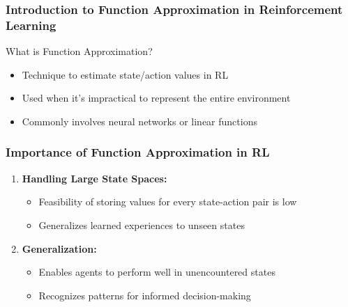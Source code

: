 \documentclass[aspectratio=169]{beamer}
\begin{document}
\frame{\titlepage}

\begin{frame}[fragile]
    \frametitle{Introduction to Function Approximation in Reinforcement Learning}
    \begin{block}{What is Function Approximation?}
        \begin{itemize}
            \item Technique to estimate state/action values in RL
            \item Used when it's impractical to represent the entire environment
            \item Commonly involves neural networks or linear functions
        \end{itemize}
    \end{block}
\end{frame}

\begin{frame}[fragile]
    \frametitle{Importance of Function Approximation in RL}
    \begin{enumerate}
        \item \textbf{Handling Large State Spaces:}
            \begin{itemize}
                \item Feasibility of storing values for every state-action pair is low
                \item Generalizes learned experiences to unseen states
            \end{itemize}
        
        \item \textbf{Generalization:}
            \begin{itemize}
                \item Enables agents to perform well in unencountered states
                \item Recognizes patterns for informed decision-making
            \end{itemize}
    \end{enumerate}
\end{frame}
\end{document}
